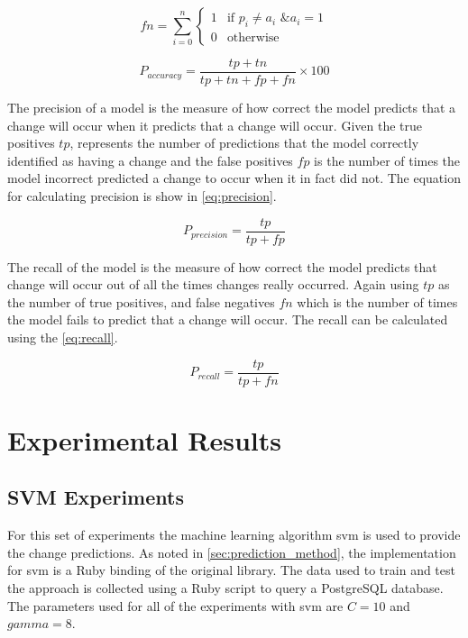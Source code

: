 \begin{equation}
\label{eq:false_negative}
fn = \sum_{i=0}^{n}\left\{\begin{matrix}
1 & \text{if } p_i \neq a_i \text{ \& } a_i = 1\\ 
0 & \text{otherwise}
\end{matrix}\right.
\end{equation}

\begin{equation}
\label{eq:prediction_accuracy}
P_{accuracy} = \frac{tp+tn}{tp+tn+fp+fn} \times 100
\end{equation}

The precision of a model is the measure of how correct the model predicts that a change will occur when it predicts that a change will occur. Given the true positives $tp$, represents the number of predictions that the model correctly identified as having a change and the false positives $fp$ is the number of times the model incorrect predicted a change to occur when it in fact did not. The equation for calculating precision is show in \autoref{eq:precision}.



\begin{equation} 
\label{eq:precision}
P_{precision} = \frac{tp}{tp+fp}
\end{equation}

The recall of the model is the measure of how correct the model predicts that change will occur out of all the times changes really occurred. Again using $tp$ as the number of true positives, and false negatives $fn$ which is the number of times the model fails to predict that a change will occur. The recall can be calculated using the \autoref{eq:recall}.

\begin{equation} 
\label{eq:recall}
P_{recall} = \frac{tp}{tp+fn}
\end{equation}

\section{Experimental Results}
\label{sec:experimental_results}

\subsection{SVM Experiments}
\label{subsec:svm_experiments}

For this set of experiments the machine learning algorithm \gls{svm} is used to provide the change predictions. As noted in \autoref{sec:prediction_method}, the implementation for \gls{svm} is a Ruby binding of the original library. The data used to train and test the approach is collected using a Ruby script to query a PostgreSQL database. The parameters used for all of the experiments with \gls{svm} are $C = 10$ and $gamma = 8$.


